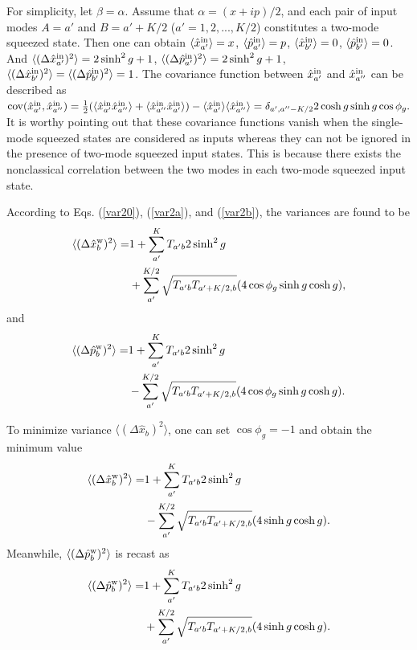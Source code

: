 \documentclass[9pt,twocolumn,twoside]{osajnl}
\begin{document}
For simplicity, let $\beta = \alpha$. Assume that $\alpha = (x + i p)/2$, and each pair of input modes $A = a'$ and $B = a'+K/2$ ($a' = 1,2,...,K/2$) constitutes a two-mode squeezed state. Then one can obtain $\langle \hat{x}_{a'}^{\rm{in}} \rangle = x$, $\langle \hat{p}_{a'}^{\rm{in}} \rangle = p$, $\langle \hat{x}_{b'}^{\rm{in}} \rangle = 0$, $\langle \hat{p}_{b'}^{\rm{in}} \rangle = 0$. And $\langle (\Delta \hat{x}_{a'}^{\rm{in}})^2 \rangle = 2 \sinh^2 g + 1$, $\langle (\Delta \hat{p}_{a'}^{\rm{in}})^2 \rangle = 2 \sinh^2 g + 1$,
$\langle (\Delta \hat{x}_{b'}^{\rm{in}})^2 \rangle = \langle (\Delta \hat{p}_{b'}^{\rm{in}})^2 \rangle = 1$. The covariance function between $\hat{x}_{a'}^{\rm{in}}$ and $\hat{x}_{a''}^{\rm{in}}$ can be described as
${\rm{cov}}(\hat{x}_{a'}^{\rm{in}}, \hat{x}_{a''}^{\rm{in}}) = \frac{1}{2}(\langle \hat{x}_{a'}^{\rm{in}} \hat{x}_{a''}^{\rm{in}} \rangle + \langle \hat{x}_{a''}^{\rm{in}} \hat{x}_{a'}^{\rm{in}} \rangle) - \langle \hat{x}_{a'}^{\rm{in}} \rangle \langle \hat{x}_{a''}^{\rm{in}} \rangle = \delta_{a',a''-K/2} 2 \cosh g \sinh g \cos \phi_g.$ It is worthy pointing out that these covariance functions vanish when the single-mode squeezed states are considered as inputs whereas they can not be ignored in the presence of two-mode squeezed input states. This is because there exists the nonclassical correlation between the two modes in each two-mode squeezed input state.


According to Eqs. (\ref{var20}), (\ref{var2a}), and (\ref{var2b}), the variances are found to be 
\begin{align}
\langle(\Delta \hat{x}_b^{\rm{w}})^2\rangle =& 1 + \sum_{a'}^{K}{T_{a'b} 2 \sinh^2 g}\\ \nonumber
&+\sum_{a'}^{K/2}{\sqrt{T_{a'b} T_{a'+K/2, b}} (4 \cos \phi_{g} \sinh g \cosh g )},
\end{align}
and
\begin{align}
\langle(\Delta \hat{p}_b^{\rm{w}})^2\rangle =& 1 + \sum_{a'}^{K}{T_{a'b} 2 \sinh^2 g}\\ \nonumber
&-\sum_{a'}^{K/2}{\sqrt{T_{a'b} T_{a'+K/2, b}} (4 \cos \phi_{g} \sinh g \cosh g )}.
\end{align}

To minimize variance $\langle(\Delta \hat{x}_b)^2\rangle$, one can set $\cos \phi_{g} = -1$ and obtain the minimum value
\begin{align}
\label{dx200a}
\langle(\Delta \hat{x}_b^{\rm{w}})^2\rangle =& 1 + \sum_{a'}^{K}{T_{a'b} 2 \sinh^2 g} \\ \nonumber
&- \sum_{a'}^{K/2}{\sqrt{T_{a'b} T_{a'+K/2, b}} (4  \sinh g \cosh g )}.
\end{align}
Meanwhile, $\langle(\Delta \hat{p}_b^{\rm{w}})^2\rangle$ is recast as
\begin{align}
\label{dp200a}
\langle(\Delta \hat{p}_b^{\rm{w}})^2\rangle =& 1 + \sum_{a'}^{K}{T_{a'b} 2 \sinh^2 g} \\ \nonumber
&+ \sum_{a'}^{K/2}{\sqrt{T_{a'b} T_{a'+K/2, b}} (4  \sinh g \cosh g )}.
\end{align}
\end{document}
